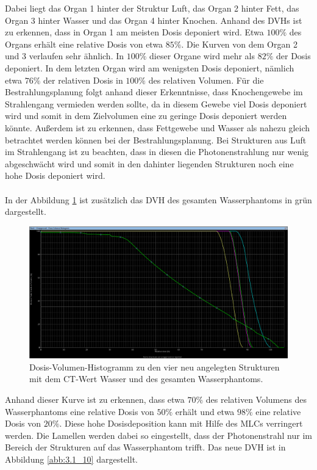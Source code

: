 Dabei liegt das Organ 1 hinter der Struktur Luft, das Organ 2 hinter Fett,
das Organ 3 hinter Wasser und das Organ 4 hinter Knochen.
Anhand des DVHs ist zu erkennen, dass in Organ 1 am meisten Dosis deponiert
wird. Etwa $100\%$ des Organs erhält eine relative Dosis von etwa $85\%$.
Die Kurven von dem Organ 2 und 3 verlaufen sehr ähnlich.
In $100\%$ dieser Organe wird mehr als $82\%$ der Dosis deponiert. In dem
letzten Organ wird am wenigsten Dosis deponiert, nämlich etwa $76\%$ der
relativen Dosis in $100\%$ des relativen Volumen.
Für die Bestrahlungsplanung folgt anhand dieser Erkenntnisse, dass
Knochengewebe im Strahlengang vermieden werden sollte, da in diesem Gewebe
viel Dosis deponiert wird und somit in dem Zielvolumen eine zu
geringe Dosis deponiert werden könnte. Außerdem ist zu erkennen, dass
Fettgewebe und Wasser als
nahezu gleich betrachtet werden können bei der Bestrahlungsplanung.
Bei Strukturen aus Luft im Strahlengang ist zu beachten, dass in diesen die
Photonenstrahlung nur wenig abgeschwächt wird und somit in den
dahinter liegenden Strukturen noch eine hohe Dosis deponiert wird. \\\\

In der Abbildung \ref{abb:3.1_9} ist zusätzlich das DVH des gesamten
Wasserphantoms in grün dargestellt.

\begin{figure}[H]
  \centering
  \includegraphics[width=\textwidth]{../../Wasserphantom Bilder/Aufgabe3.1_9.png}
  \caption{Dosis-Volumen-Histogramm zu den vier neu angelegten Strukturen mit dem CT-Wert Wasser und des gesamten Wasserphantoms.}
  \label{abb:3.1_9}
\end{figure}

Anhand dieser Kurve ist zu erkennen, dass etwa $70 \%$ des relativen Volumens
des Wasserphantoms eine relative Dosis von $50\%$ erhält und etwa $98\%$ eine
relative Dosis von $20\%$. Diese hohe Dosisdeposition kann mit Hilfe
des MLCs verringert werden. Die Lamellen werden dabei so eingestellt, dass
der Photonenstrahl nur im Bereich der Strukturen auf das Wasserphantom trifft.
Das neue DVH ist in Abbildung \ref{abb:3.1_10} dargestellt.

